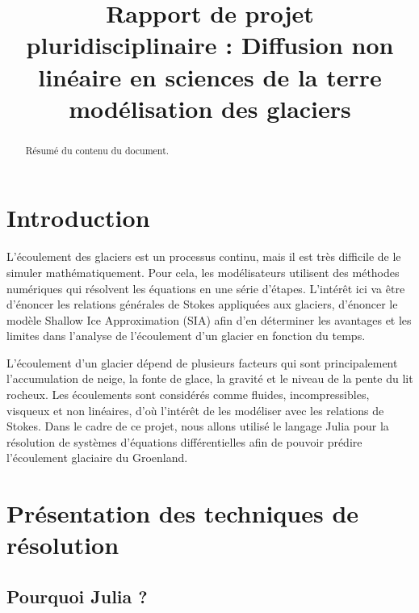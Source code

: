 \documentclass{article}
\begin{document}
\title{\textbf{Rapport de projet pluridisciplinaire :} \newline Diffusion non linéaire en sciences de la terre modélisation des glaciers}

\maketitle

\author{} 


\newpage

\tableofcontents

\begin{abstract}
Résumé du contenu du document.
\end{abstract}

\newpage
\section{Introduction}\label{sec:intro}

L’écoulement des glaciers est un processus continu, mais il est très difficile de le simuler mathématiquement. Pour cela, les modélisateurs utilisent des méthodes numériques qui résolvent les équations en une série d’étapes.
L’intérêt ici va être d’énoncer les relations générales de Stokes appliquées aux glaciers, d’énoncer le modèle Shallow Ice Approximation (SIA) afin d’en déterminer les avantages et les limites dans l’analyse de l’écoulement d’un glacier en fonction du temps.

L’écoulement d’un glacier dépend de plusieurs facteurs qui sont principalement l’accumulation de neige, la fonte de glace, la gravité et le niveau de la pente du lit rocheux.
Les écoulements sont considérés comme fluides, incompressibles, visqueux et non linéaires, d’où l’intérêt de les modéliser avec les relations de Stokes.
Dans le cadre de ce projet, nous allons utilisé le langage Julia pour la résolution de systèmes d'équations différentielles afin de pouvoir prédire l'écoulement glaciaire du Groenland.


\section{Présentation des techniques de résolution}

\subsection{Pourquoi Julia ?}
\end{document}

